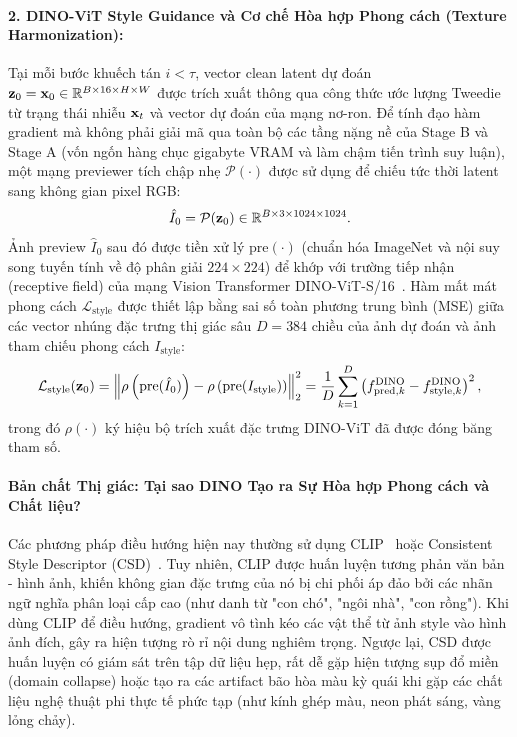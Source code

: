 \documentclass[runningheads]{llncs}
\begin{document}
\paragraph{2. DINO-ViT Style Guidance và Cơ chế Hòa hợp Phong cách (Texture Harmonization):}
Tại mỗi bước khuếch tán $i < \tau$, vector clean latent dự đoán $\mathbf{z}_0 = \mathbf{x}_0 \in \mathbb{R}^{B \times 16 \times H \times W}$ được trích xuất thông qua công thức ước lượng Tweedie từ trạng thái nhiễu $\mathbf{x}_t$ và vector dự đoán của mạng nơ-ron. Để tính đạo hàm gradient mà không phải giải mã qua toàn bộ các tầng nặng nề của Stage B và Stage A (vốn ngốn hàng chục gigabyte VRAM và làm chậm tiến trình suy luận), một mạng previewer tích chập nhẹ $\mathcal{P}(\cdot)$ được sử dụng để chiếu tức thời latent sang không gian pixel RGB:
\begin{equation}
    \hat{I}_0 = \mathcal{P}(\mathbf{z}_0) \in \mathbb{R}^{B \times 3 \times 1024 \times 1024}.
\end{equation}
Ảnh preview $\hat{I}_0$ sau đó được tiền xử lý $\text{pre}(\cdot)$ (chuẩn hóa ImageNet và nội suy song tuyến tính về độ phân giải $224 \times 224$) để khớp với trường tiếp nhận (receptive field) của mạng Vision Transformer DINO-ViT-S/16~\cite{dino}. Hàm mất mát phong cách $\mathcal{L}_{\text{style}}$ được thiết lập bằng sai số toàn phương trung bình (MSE) giữa các vector nhúng đặc trưng thị giác sâu $D = 384$ chiều của ảnh dự đoán và ảnh tham chiếu phong cách $I_{\text{style}}$:
\begin{equation}
    \mathcal{L}_{\text{style}}(\mathbf{z}_0) = \left\lVert \rho\left( \text{pre}(\hat{I}_0) \right) - \rho\left( \text{pre}(I_{\text{style}}) \right) \right\rVert_2^2 = \frac{1}{D} \sum_{k=1}^D \left( f_{\text{pred}, k}^{\text{DINO}} - f_{\text{style}, k}^{\text{DINO}} \right)^2,
    \label{eq:dino_loss_vn}
\end{equation}
trong đó $\rho(\cdot)$ ký hiệu bộ trích xuất đặc trưng DINO-ViT đã được đóng băng tham số.

\paragraph{Bản chất Thị giác: Tại sao DINO Tạo ra Sự Hòa hợp Phong cách và Chất liệu?}
Các phương pháp điều hướng hiện nay thường sử dụng CLIP~\cite{clip} hoặc Consistent Style Descriptor (CSD)~\cite{rout2025rbmodulation}. Tuy nhiên, CLIP được huấn luyện tương phản văn bản - hình ảnh, khiến không gian đặc trưng của nó bị chi phối áp đảo bởi các nhãn ngữ nghĩa phân loại cấp cao (như danh từ "con chó", "ngôi nhà", "con rồng"). Khi dùng CLIP để điều hướng, gradient vô tình kéo các vật thể từ ảnh style vào hình ảnh đích, gây ra hiện tượng rò rỉ nội dung nghiêm trọng. Ngược lại, CSD được huấn luyện có giám sát trên tập dữ liệu hẹp, rất dễ gặp hiện tượng sụp đổ miền (domain collapse) hoặc tạo ra các artifact bão hòa màu kỳ quái khi gặp các chất liệu nghệ thuật phi thực tế phức tạp (như kính ghép màu, neon phát sáng, vàng lỏng chảy).
\end{document}
